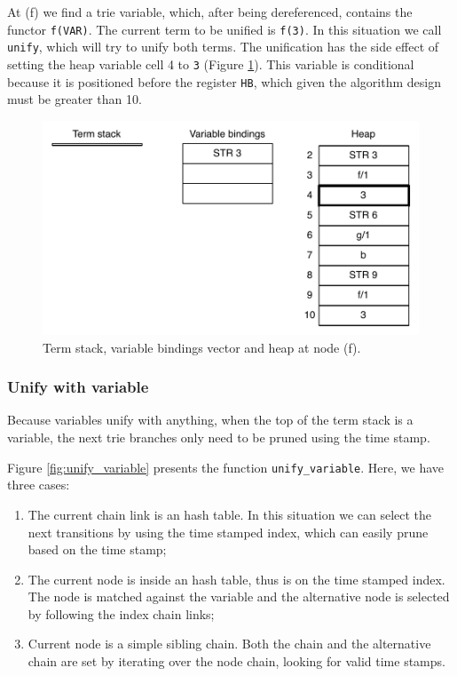At (f) we find a trie variable, which, after being dereferenced, contains the
functor \texttt{f(VAR)}. The current term to be unified is \texttt{f(3)}.
In this situation we call \texttt{unify}, which will try to unify both terms.
The unification has the side effect of setting the heap variable cell 4 to \texttt{3}
(Figure \ref{fig:collect_functor5}).
This variable is conditional because it is positioned before the register \texttt{HB},
which given the algorithm design must be greater than 10.

\begin{figure}[H]
  \centering
    \includegraphics[scale=0.6]{collect_functor5.pdf}
  \caption{Term stack, variable bindings vector and heap at node (f).}
  \label{fig:collect_functor5}
\end{figure}

\subsubsection{Unify with variable}

Because variables unify with anything, when the top of the term
stack is a variable, the next trie branches only need to be pruned using the time stamp.

Figure \ref{fig:unify_variable} presents the function
\texttt{unify\_variable}. Here, we have three cases:

\begin{enumerate}
  \item The current chain link is an hash table. In this situation we can select the next transitions by using the time stamped index, which can easily prune based on the time stamp;
  \item The current node is inside an hash table, thus is on the time stamped index. The node is matched against the variable and the alternative node is selected by following the index chain links;
  \item Current node is a simple sibling chain. Both the chain and the alternative chain are set by iterating over the node chain, looking for valid time stamps.
\end{enumerate}

